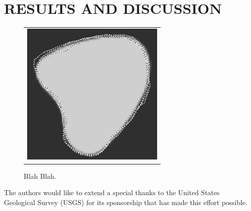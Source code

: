 \documentclass[]{spie}  %
\begin{document}
\section{RESULTS AND DISCUSSION}
\label{sec:results}  %
   \begin{figure}
   \begin{center}
   \begin{tabular}{c}
   \includegraphics[height=7cm]{mcr3b.eps}
   \end{tabular}
   \end{center}
   \caption[example] 
   { \label{fig:example} 
Blah Blah.}
   \end{figure} 
\acknowledgments     %
The authors would like to extend a special thanks to the United States Geological Survey (USGS) for its sponsorship that has made this effort possible.

   
\end{document}
